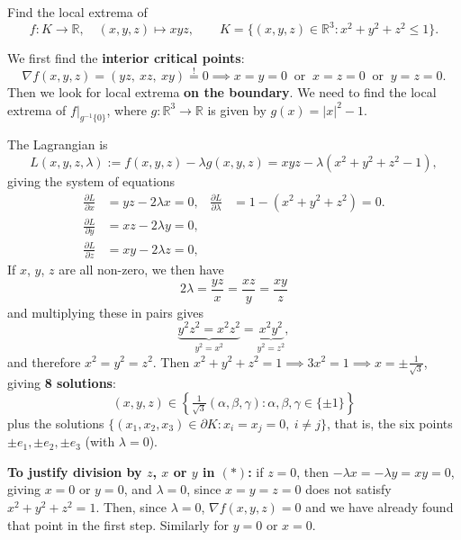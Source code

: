 \begin{example}
\label{ex:xyz_on_ball}
Find the local extrema of
\[f : K \to \mathbb{R}, \quad (x,y,z) \mapsto xyz, \qquad K = \{(x,y,z) \in \mathbb{R}^3 : x^2+y^2+z^2 \leq 1\}.\]

\medskip
We first find the \textbf{interior critical points}:
\[\nabla f(x,y,z) = (yz,\ xz,\ xy) \overset{!}{=} 0 \implies x = y = 0 \ \text{ or } \ x = z = 0 \ \text{ or } \ y = z = 0.\]
Then we look for local extrema \textbf{on the boundary}. We need to find the local extrema of
$f|_{g^{-1}\{0\}}$, where $g : \mathbb{R}^3\to\mathbb{R}$ is given by $g(x) = |x|^2 - 1$.

The Lagrangian is
\[L(x,y,z,\lambda) := f(x,y,z) - \lambda g(x,y,z) = xyz - \lambda(x^2+y^2+z^2-1),\]
giving the system of equations
\[
\begin{aligned}
\frac{\partial L}{\partial x} &= yz - 2\lambda x = 0, & \frac{\partial L}{\partial \lambda} &= 1 - (x^2+y^2+z^2) = 0. \\
\frac{\partial L}{\partial y} &= xz - 2\lambda y = 0, \\
\frac{\partial L}{\partial z} &= xy - 2\lambda z = 0,
\end{aligned}
\]
If $x$, $y$, $z$ are all non-zero, we then have
\begin{equation*}
2\lambda = \frac{yz}{x} = \frac{xz}{y} = \frac{xy}{z} \tag{$*$}
\end{equation*}
and multiplying these in pairs gives
\[\underbrace{y^2z^2 = x^2z^2}_{y^2 = x^2} = \underbrace{x^2y^2}_{y^2 = z^2},\]
and therefore $x^2 = y^2 = z^2$.
Then $x^2+y^2+z^2 = 1 \implies 3x^2 = 1 \implies x = \pm\frac{1}{\sqrt{3}}$, giving
\textbf{8 solutions}:
\[(x,y,z) \in \left\{\tfrac{1}{\sqrt{3}}(\alpha,\beta,\gamma) : \alpha,\beta,\gamma \in \{\pm 1\}\right\}\]
plus the solutions $\{(x_1,x_2,x_3) \in \partial K : x_i = x_j = 0,\ i \neq j\}$, that is, the
six points $\pm e_1, \pm e_2, \pm e_3$ (with $\lambda = 0$).

\textbf{To justify division by $z$, $x$ or $y$ in $(*)$:} if $z = 0$, then
$-\lambda x = -\lambda y = xy = 0$, giving $x = 0$ or $y = 0$, and $\lambda = 0$, since
$x = y = z = 0$ does not satisfy $x^2+y^2+z^2 = 1$. Then, since $\lambda = 0$,
$\nabla f(x,y,z) = 0$ and we have already found that point in the first step. Similarly for
$y = 0$ or $x = 0$.


\end{example}
